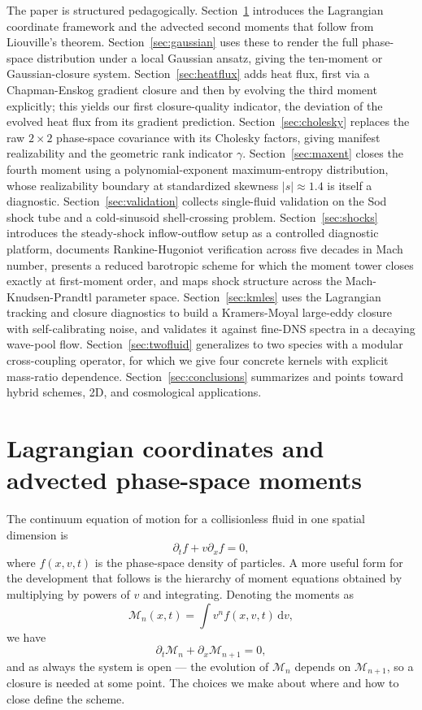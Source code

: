 \documentclass[11pt,letterpaper]{article}
\newcommand{\diff}{\mathrm{d}}
\begin{document}
The paper is structured pedagogically. Section~\ref{sec:lagrangian} introduces the Lagrangian coordinate framework and the advected second moments that follow from Liouville's theorem. Section~\ref{sec:gaussian} uses these to render the full phase-space distribution under a local Gaussian ansatz, giving the ten-moment or Gaussian-closure system. Section~\ref{sec:heatflux} adds heat flux, first via a Chapman-Enskog gradient closure and then by evolving the third moment explicitly; this yields our first closure-quality indicator, the deviation of the evolved heat flux from its gradient prediction. Section~\ref{sec:cholesky} replaces the raw $2\times 2$ phase-space covariance with its Cholesky factors, giving manifest realizability and the geometric rank indicator $\gamma$. Section~\ref{sec:maxent} closes the fourth moment using a polynomial-exponent maximum-entropy distribution, whose realizability boundary at standardized skewness $|s| \approx 1.4$ is itself a diagnostic. Section~\ref{sec:validation} collects single-fluid validation on the Sod shock tube and a cold-sinusoid shell-crossing problem. Section~\ref{sec:shocks} introduces the steady-shock inflow-outflow setup as a controlled diagnostic platform, documents Rankine-Hugoniot verification across five decades in Mach number, presents a reduced barotropic scheme for which the moment tower closes exactly at first-moment order, and maps shock structure across the Mach-Knudsen-Prandtl parameter space. Section~\ref{sec:kmles} uses the Lagrangian tracking and closure diagnostics to build a Kramers-Moyal large-eddy closure with self-calibrating noise, and validates it against fine-DNS spectra in a decaying wave-pool flow. Section~\ref{sec:twofluid} generalizes to two species with a modular cross-coupling operator, for which we give four concrete kernels with explicit mass-ratio dependence. Section~\ref{sec:conclusions} summarizes and points toward hybrid schemes, 2D, and cosmological applications.

\section{Lagrangian coordinates and advected phase-space moments}
\label{sec:lagrangian}

The continuum equation of motion for a collisionless fluid in one spatial dimension is
\begin{equation}
\partial_t f + v \partial_x f = 0,
\end{equation}
where $f(x, v, t)$ is the phase-space density of particles. A more useful form for the development that follows is the hierarchy of moment equations obtained by multiplying by powers of $v$ and integrating. Denoting the moments as
\begin{equation}
\mathcal{M}_n(x, t) = \int v^n f(x, v, t)\, \diff v,
\end{equation}
we have
\begin{equation}
\partial_t \mathcal{M}_n + \partial_x \mathcal{M}_{n+1} = 0,
\end{equation}
and as always the system is open --- the evolution of $\mathcal{M}_n$ depends on $\mathcal{M}_{n+1}$, so a closure is needed at some point. The choices we make about where and how to close define the scheme.
\end{document}
